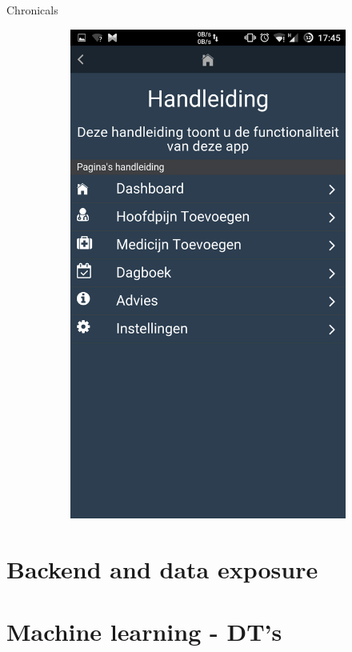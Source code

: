 \documentclass[english]{beamer}
\begin{document}
\begin{frame}{Chronicals}
\begin{figure}[!h]
\begin{subfigure}[b]{0.3\textwidth}
		\includegraphics[width=\textwidth]{figures/manual.png}
	\end{subfigure}
\end{figure}
\end{frame}
\section{Backend and data exposure}
\section{Machine learning - DT's}
\end{document}
